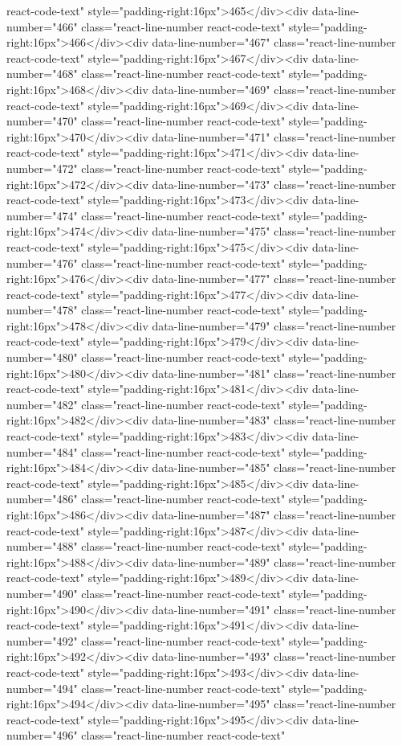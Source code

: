 react-code-text" style="padding-right:16px">465</div><div data-line-number="466" class="react-line-number react-code-text" style="padding-right:16px">466</div><div data-line-number="467" class="react-line-number react-code-text" style="padding-right:16px">467</div><div data-line-number="468" class="react-line-number react-code-text" style="padding-right:16px">468</div><div data-line-number="469" class="react-line-number react-code-text" style="padding-right:16px">469</div><div data-line-number="470" class="react-line-number react-code-text" style="padding-right:16px">470</div><div data-line-number="471" class="react-line-number react-code-text" style="padding-right:16px">471</div><div data-line-number="472" class="react-line-number react-code-text" style="padding-right:16px">472</div><div data-line-number="473" class="react-line-number react-code-text" style="padding-right:16px">473</div><div data-line-number="474" class="react-line-number react-code-text" style="padding-right:16px">474</div><div data-line-number="475" class="react-line-number react-code-text" style="padding-right:16px">475</div><div data-line-number="476" class="react-line-number react-code-text" style="padding-right:16px">476</div><div data-line-number="477" class="react-line-number react-code-text" style="padding-right:16px">477</div><div data-line-number="478" class="react-line-number react-code-text" style="padding-right:16px">478</div><div data-line-number="479" class="react-line-number react-code-text" style="padding-right:16px">479</div><div data-line-number="480" class="react-line-number react-code-text" style="padding-right:16px">480</div><div data-line-number="481" class="react-line-number react-code-text" style="padding-right:16px">481</div><div data-line-number="482" class="react-line-number react-code-text" style="padding-right:16px">482</div><div data-line-number="483" class="react-line-number react-code-text" style="padding-right:16px">483</div><div data-line-number="484" class="react-line-number react-code-text" style="padding-right:16px">484</div><div data-line-number="485" class="react-line-number react-code-text" style="padding-right:16px">485</div><div data-line-number="486" class="react-line-number react-code-text" style="padding-right:16px">486</div><div data-line-number="487" class="react-line-number react-code-text" style="padding-right:16px">487</div><div data-line-number="488" class="react-line-number react-code-text" style="padding-right:16px">488</div><div data-line-number="489" class="react-line-number react-code-text" style="padding-right:16px">489</div><div data-line-number="490" class="react-line-number react-code-text" style="padding-right:16px">490</div><div data-line-number="491" class="react-line-number react-code-text" style="padding-right:16px">491</div><div data-line-number="492" class="react-line-number react-code-text" style="padding-right:16px">492</div><div data-line-number="493" class="react-line-number react-code-text" style="padding-right:16px">493</div><div data-line-number="494" class="react-line-number react-code-text" style="padding-right:16px">494</div><div data-line-number="495" class="react-line-number react-code-text" style="padding-right:16px">495</div><div data-line-number="496" class="react-line-number react-code-text" 